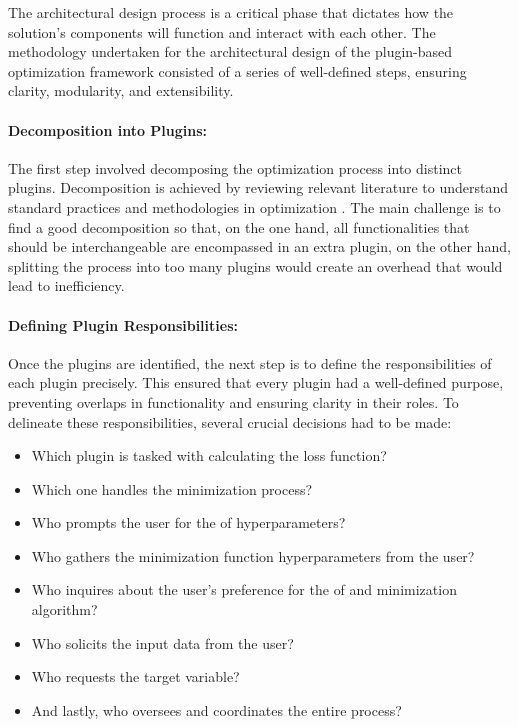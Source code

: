 \documentclass[
  a4paper,  %
  twoside,  %
  bibliography=totoc,
  headsepline,
  cleardoublepage=empty,
  parskip=half,
  draft=false
]{scrbook}
\begin{document}
The architectural design process is a critical phase that dictates how the solution's components will function and interact with each other.
The methodology undertaken for the architectural design of the plugin-based optimization framework consisted of a series of well-defined steps, ensuring clarity, modularity, and extensibility.

\paragraph{Decomposition into Plugins:}
The first step involved decomposing the optimization process into distinct plugins.
Decomposition is achieved by reviewing relevant literature to understand standard practices and methodologies in optimization \cite{Virtanen2020, Nocedal2006, ShalevShwartz2014, Weinan2017}.
The main challenge is to find a good decomposition so that, on the one hand, all functionalities that should be interchangeable are encompassed in an extra plugin,
on the other hand, splitting the process into too many plugins would create an overhead that would lead to inefficiency.

\paragraph{Defining Plugin Responsibilities:}
Once the plugins are identified, the next step is to define the responsibilities of each plugin precisely.
This ensured that every plugin had a well-defined purpose, preventing overlaps in functionality and ensuring clarity in their roles.
To delineate these responsibilities, several crucial decisions had to be made:

\begin{itemize}
  \item Which plugin is tasked with calculating the loss function?
  \item Which one handles the minimization process?
  \item Who prompts the user for the \gls{of} hyperparameters?
  \item Who gathers the minimization function hyperparameters from the user?
  \item Who inquires about the user's preference for the \gls{of} and minimization algorithm?
  \item Who solicits the input data from the user?
  \item Who requests the target variable?
  \item And lastly, who oversees and coordinates the entire process?
\end{itemize}
\end{document}
